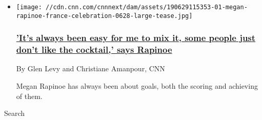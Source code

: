 \begin{itemize}
\item
  \href{/2020/08/05/football/megan-rapinoe-uswnt-activism-spt-intl/index.html}{}

  \texttt{[image: //cdn.cnn.com/cnnnext/dam/assets/190629115353-01-megan-rapinoe-france-celebration-0628-large-tease.jpg]}

  \hypertarget{its-always-been-easy-for-me-to-mix-it-some-people-just-dont-like-the-cocktail-says-rapinoe-1}{%
  \subsubsection{\texorpdfstring{\href{/2020/08/05/football/megan-rapinoe-uswnt-activism-spt-intl/index.html}{'It's
  always been easy for me to mix it, some people just don't like the
  cocktail,' says
  Rapinoe}}{'It's always been easy for me to mix it, some people just don't like the cocktail,' says Rapinoe}}\label{its-always-been-easy-for-me-to-mix-it-some-people-just-dont-like-the-cocktail-says-rapinoe-1}}

  By Glen Levy and Christiane Amanpour, CNN

  Megan Rapinoe has always been about goals, both the scoring and
  achieving of them.
\end{itemize}

Search

